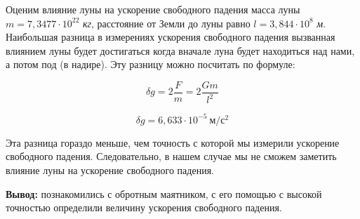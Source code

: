 \documentclass[12pt,a4paper]{article}
\begin{document}
Оценим влияние луны на ускорение свободного падения масса луны $m = 7,3477 \cdot 10^{22}$ \textit{кг}, расстояние от Земли до луны равно $l = 3,844 \cdot 10^8$ \textit{м}. Наибольшая разница в измерениях ускорения свободного падения вызванная влиянием луны будет достигаться когда вначале луна будет находиться над нами, а потом под (в надире). Эту разницу можно посчитать по формуле:

\[\delta g = 2\frac{F}{m} = 2\frac{Gm}{l^2}\]

\[\delta g = 6,633 \cdot 10^{-5} \: \textit{м}/\textit{с}^2\]

Эта разница гораздо меньше, чем точность с которой мы измерили ускорение свободного падения.  Следовательно, в нашем случае мы не сможем заметить влияние луны на ускорение свободного падения.

\textbf{Вывод:} познакомились с обротным маятником, с его помощью с высокой точностью определили величину ускорения свободного падения.
\end{document}
